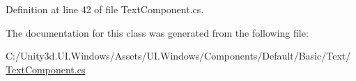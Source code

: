 Definition at line 42 of file Text\+Component.\+cs.



The documentation for this class was generated from the following file\+:\begin{DoxyCompactItemize}
\item 
C\+:/\+Unity3d.\+U\+I.\+Windows/\+Assets/\+U\+I.\+Windows/\+Components/\+Default/\+Basic/\+Text/\hyperlink{_text_component_8cs}{Text\+Component.\+cs}\end{DoxyCompactItemize}
